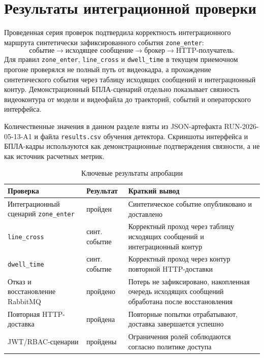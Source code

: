 \section{Результаты интеграционной проверки}

Проведенная серия проверок подтвердила корректность интеграционного маршрута синтетически зафиксированного события \texttt{zone\_enter}:
\begin{equation}
\text{событие} \rightarrow \text{исходящее сообщение} \rightarrow \text{брокер} \rightarrow \text{HTTP-получатель}.
\end{equation}
Для правил \texttt{zone\_enter}, \texttt{line\_cross} и \texttt{dwell\_time} в текущем приемочном прогоне проверялся не полный путь от видеокадра, а прохождение синтетического события через таблицу исходящих сообщений и интеграционный контур. Демонстрационный БПЛА-сценарий отдельно показывает связность видеоконтура от модели и видеофайла до траекторий, событий и операторского интерфейса.

Количественные значения в данном разделе взяты из JSON-артефакта RUN-2026-05-13-A1 и файла \texttt{results.csv} обучения детектора. Скриншоты интерфейса и БПЛА-кадры используются как демонстрационные подтверждения связности, а не как источник расчетных метрик.

\begin{table}[H]
\caption{Ключевые результаты апробации}
\label{tab:short_main_results}
\begin{tabularx}{\textwidth}{>{\raggedright\arraybackslash}p{}p{}X}
\toprule
Проверка & Результат & Краткий вывод \\
\midrule
Интеграционный сценарий \texttt{zone\_enter} & пройден & Синтетическое событие опубликовано и доставлено \\
\texttt{line\_cross} & синт. событие & Корректный проход через таблицу исходящих сообщений и интеграционный контур \\
\texttt{dwell\_time} & синт. событие & Корректный проход через контур повторной HTTP-доставки \\
Отказ и восстановление RabbitMQ & пройдено & Потерь не зафиксировано, накопленная очередь исходящих сообщений обработана после восстановления \\
Повторная HTTP-доставка & пройдена & Повторные попытки отрабатывают, доставка завершается успешно \\
JWT/RBAC-сценарии & пройдены & Ограничения ролей соблюдаются согласно политике доступа \\
\bottomrule
\end{tabularx}
\end{table}

